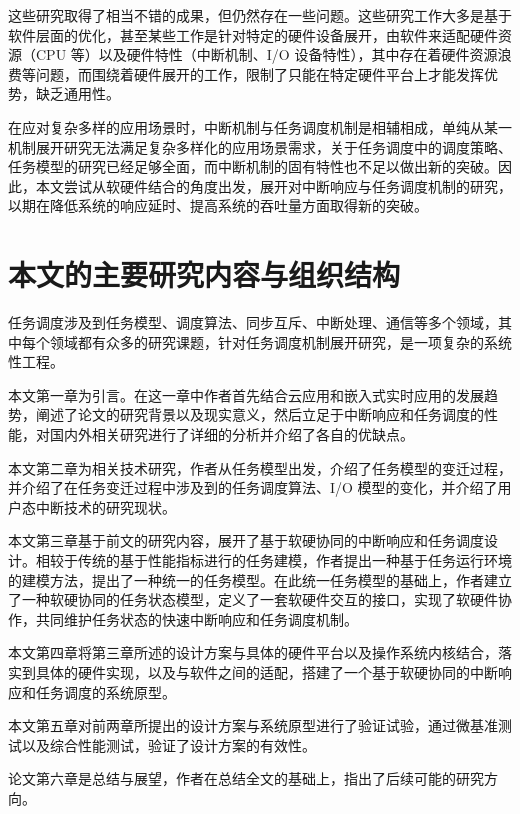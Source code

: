 这些研究取得了相当不错的成果，但仍然存在一些问题。这些研究工作大多是基于软件层面的优化，甚至某些工作是针对特定的硬件设备展开，由软件来适配硬件资源（CPU 等）以及硬件特性（中断机制、I/O 设备特性），其中存在着硬件资源浪费等问题，而围绕着硬件展开的工作，限制了只能在特定硬件平台上才能发挥优势，缺乏通用性。

在应对复杂多样的应用场景时，中断机制与任务调度机制是相辅相成，单纯从某一机制展开研究无法满足复杂多样化的应用场景需求，关于任务调度中的调度策略、任务模型的研究已经足够全面，而中断机制的固有特性也不足以做出新的突破。因此，本文尝试从软硬件结合的角度出发，展开对中断响应与任务调度机制的研究，以期在降低系统的响应延时、提高系统的吞吐量方面取得新的突破。

\section{本文的主要研究内容与组织结构}

任务调度涉及到任务模型、调度算法、同步互斥、中断处理、通信等多个领域，其中每个领域都有众多的研究课题，针对任务调度机制展开研究，是一项复杂的系统性工程。

本文第一章为引言。在这一章中作者首先结合云应用和嵌入式实时应用的发展趋势，阐述了论文的研究背景以及现实意义，然后立足于中断响应和任务调度的性能，对国内外相关研究进行了详细的分析并介绍了各自的优缺点。

本文第二章为相关技术研究，作者从任务模型出发，介绍了任务模型的变迁过程，并介绍了在任务变迁过程中涉及到的任务调度算法、I/O 模型的变化，并介绍了用户态中断技术的研究现状。

本文第三章基于前文的研究内容，展开了基于软硬协同的中断响应和任务调度设计。相较于传统的基于性能指标进行的任务建模，作者提出一种基于任务运行环境的建模方法，提出了一种统一的任务模型。在此统一任务模型的基础上，作者建立了一种软硬协同的任务状态模型，定义了一套软硬件交互的接口，实现了软硬件协作，共同维护任务状态的快速中断响应和任务调度机制。

本文第四章将第三章所述的设计方案与具体的硬件平台以及操作系统内核结合，落实到具体的硬件实现，以及与软件之间的适配，搭建了一个基于软硬协同的中断响应和任务调度的系统原型。

本文第五章对前两章所提出的设计方案与系统原型进行了验证试验，通过微基准测试以及综合性能测试，验证了设计方案的有效性。

论文第六章是总结与展望，作者在总结全文的基础上，指出了后续可能的研究方向。
